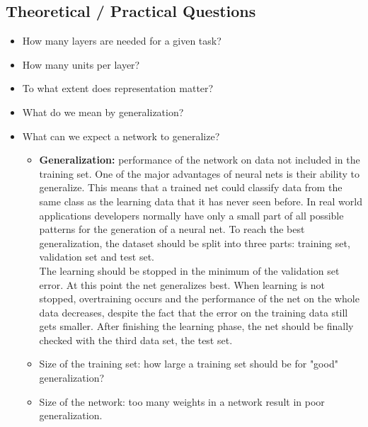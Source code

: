 \subsection{Theoretical / Practical Questions}
\begin{itemize}
	\item How many layers are needed for a given task?
	\item How many units per layer?
	\item To what extent does representation matter?
	\item What do we mean by generalization?
	\item What can we expect a network to generalize?
	\begin{itemize}
		\item \textbf{Generalization:} performance of the network on data not included in the training set. One of the major advantages of neural nets is their ability to generalize. This means that a trained net could classify data from the same class as the learning data that it has never seen before. In real world applications developers normally have only a small part of all possible patterns for the generation of a neural net. To reach the best generalization, the dataset should be split into three parts: training set, validation set and test set.\\
		The learning should be stopped in the minimum of the validation set error. At this point the net generalizes best. When learning is not stopped, overtraining occurs and the performance of the net on the whole data decreases, despite the fact that the error on the training data still gets smaller. After finishing the learning phase, the net should be finally checked with the third data set, the test set.
		\item Size of the training set: how large a training set should be for "good" generalization?
		\item Size of the network: too many weights in a network result in poor generalization.
	\end{itemize}
\end{itemize}

